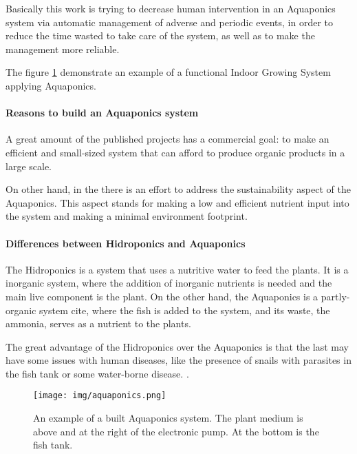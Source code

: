 Basically this work is trying to decrease human intervention in an Aquaponics system via automatic management of adverse and periodic events,
in order to reduce the time wasted to take care of the system, 
as well as to make the management more reliable.

The figure \ref{fig:aquaponicsExample} demonstrate an example of a functional Indoor Growing System applying Aquaponics.

\paragraph{Reasons to build an Aquaponics system}

A great amount of the published projects has a commercial goal:
to make an efficient and small-sized system that can afford to produce organic products in a large scale.

On other hand,
in the \cite{GoddekDelaideMankasinghEtAl2015} there is an effort to address the sustainability aspect of the Aquaponics.
This aspect stands for making a low and efficient nutrient input into the system and making a minimal environment footprint.

\paragraph{Differences between Hidroponics and Aquaponics}

The Hidroponics is a system that uses a nutritive water to feed the plants.
It is a inorganic system, 
where the addition of inorganic nutrients is needed and the main live component is the plant.
On the other hand, the Aquaponics is a partly-organic system cite,
where the fish is added to the system,
and its waste,
the ammonia,
serves as a nutrient to the plants.

The great advantage of the Hidroponics over the Aquaponics is that the last may have some issues with human diseases,
like the presence of snails with parasites in the fish tank or some water-borne disease. \cite{wilson2005greenhouse}.

\begin{figure}[h]
    \centering
    \texttt{[image: img/aquaponics.png]}
    \caption{An example of a built Aquaponics system. The plant medium is above and at the right of the electronic pump. At the bottom is the fish tank. \cite{goldstein2013indoor}}
    \label{fig:aquaponicsExample}
\end{figure}


